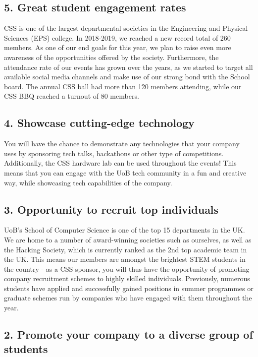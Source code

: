 \documentclass{article}
\begin{document}
\subsection*{5. Great student engagement rates}

CSS is one of the largest departmental societies in the Engineering and Physical Sciences (EPS) college. In 2018-2019, we reached a new record total of 260 members. As one of our end goals for this year, we plan to raise even more awareness of the opportunities offered by the society.
Furthermore, the attendance rate of our events has grown over the years, as we started to target all available social media channels and make use of our strong bond with the School board. 
The annual CSS ball had more than 120 members attending, while our CSS BBQ reached a turnout of 80 members.

\subsection*{4. Showcase cutting-edge technology}

You will have the chance to demonstrate any technologies that your company uses by sponsoring tech talks, hackathons or other type of competitions. Additionally, the CSS hardware lab can be used throughout the events! 
This means that you can engage with the UoB tech community in a fun and creative way, while showcasing tech capabilities of the company.

\subsection*{3. Opportunity to recruit top individuals}

UoB’s School of Computer Science is one of the top 15 departments in the UK. We are home to a number of award-winning societies such as ourselves, as well as the Hacking Society, which is currently ranked as the 2nd top academic team in the UK.
This means our members are amongst the brightest STEM students in the country - as a CSS sponsor, you will thus have the opportunity of promoting company recruitment schemes to highly skilled individuals.
Previously, numerous students have applied and successfully gained positions in summer programmes or graduate schemes run by companies who have engaged with them throughout the year. 

\subsection*{2. Promote your company to a diverse group of students}
\end{document}
